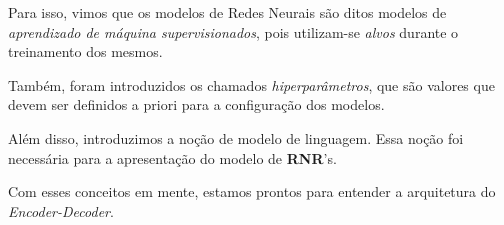 Para isso, vimos que os modelos de Redes Neurais são ditos modelos de \textit{aprendizado de máquina supervisionados}, pois utilizam-se \textit{alvos} durante o treinamento dos mesmos.

Também, foram introduzidos os chamados \textit{hiperparâmetros}, que são valores que devem ser definidos a priori para a configuração dos modelos. 

Além disso, introduzimos a noção de modelo de linguagem. Essa noção foi necessária para a apresentação do modelo de \textbf{RNR}'s. 

Com esses conceitos em mente, estamos prontos para entender a arquitetura do \textit{Encoder-Decoder}.

